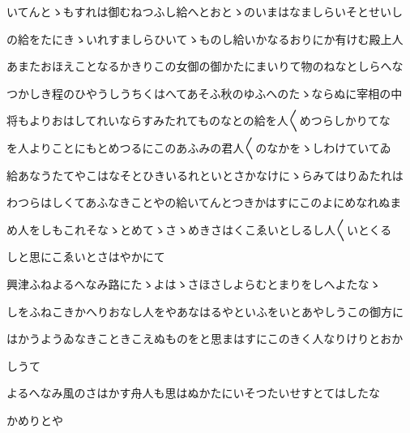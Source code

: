\documentclass[a4paper,11pt,landscape]{ltjtarticle}
\begin{document}
いてんとゝもすれは御むねつふし給へとおとゝのいまはなましらいそとせいし
\par\medskip
の給をたにきゝいれすましらひいてゝものし給いかなるおりにか有けむ殿上人
\par\medskip
あまたおほえことなるかきりこの女御の御かたにまいりて物のねなとしらへな
\par\medskip
つかしき程のひやうしうちくはへてあそふ秋のゆふへのたゝならぬに宰相の中
\par\medskip
将もよりおはしてれいならすみたれてものなとの給を人〱めつらしかりてな
\par\medskip
を人よりことにもとめつるにこのあふみの君人〱のなかをゝしわけていてゐ
\par\medskip
給あなうたてやこはなそとひきいるれといとさかなけにゝらみてはりゐたれは
\par\medskip
わつらはしくてあふなきことやの給いてんとつきかはすにこのよにめなれぬま
\par\medskip
め人をしもこれそなゝとめてゝさゝめきさはくこゑいとしるし人〱いとくる
\par\medskip
しと思にこゑいとさはやかにて
\par\medskip
興津ふねよるへなみ路にたゝよはゝさほさしよらむとまりをしへよたなゝ
\par\medskip
しをふねこきかへりおなし人をやあなはるやといふをいとあやしうこの御方に
\par\medskip
はかうようゐなきこときこえぬものをと思まはすにこのきく人なりけりとおか
\par\medskip
しうて
\par\medskip
よるへなみ風のさはかす舟人も思はぬかたにいそつたいせすとてはしたな
\par\medskip
かめりとや
\par\medskip
\end{document}
